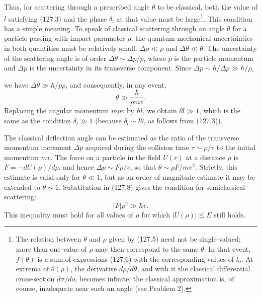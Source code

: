Thus, for scattering through a prescribed angle $\theta$ to be classical, both the value of $l$ satisfying (127.3) and the phase $\delta_l$ at that value must be large\footnote{The relation between $\theta$ and $\rho$ given by (127.5) need not be single-valued; more than one value of $\rho$ may then correspond to the same $\theta$. In that event, $f(\theta)$ is a sum of expressions (127.6) with the corresponding values of $l_0$. At extrema of $\theta(\rho)$, the derivative $d\rho/d\theta$, and with it the classical differential cross-section $d\sigma/do$, becomes infinite; the classical approximation is, of course, inadequate near such an angle (see Problem 2).}. This condition has a simple meaning. To speak of classical scattering through an angle $\theta$ for a particle passing with impact parameter $\rho$, the quantum-mechanical uncertainties in both quantities must be relatively small: $\Delta\rho\ll\rho$ and $\Delta\theta\ll\theta$. The uncertainty of the scattering angle is of order $\Delta\theta\sim\Delta p/p$, where $p$ is the particle momentum and $\Delta p$ is the uncertainty in its transverse component. Since $\Delta p\sim\hbar/\Delta\rho\gg\hbar/\rho$,

we have $\Delta\theta\gg\hbar/p\rho$, and consequently, in any event,
\begin{equation}
 \theta\gg\frac{\hbar}{\rho mv}.
 \tag{127.8}
\end{equation}
Replacing the angular momentum $m\rho v$ by $\hbar l$, we obtain $\theta l\gg1$, which is the same as the condition $\delta_l\gg1$ (because $\delta_l\sim l\theta$, as follows from (127.3)).

The classical deflection angle can be estimated as the ratio of the transverse momentum increment $\Delta p$ acquired during the collision time $\tau\sim\rho/v$ to the initial momentum $mv$. The force on a particle in the field $U(r)$ at a distance $\rho$ is $F=-dU(\rho)/d\rho$, and hence $\Delta p\sim F\rho/v$, so that $\theta\sim\rho F/mv^2$. Strictly, this estimate is valid only for $\theta\ll1$, but as an order-of-magnitude estimate it may be extended to $\theta\sim1$. Substitution in (127.8) gives the condition for semiclassical scattering:
\begin{equation}
 |F|\rho^2\gg\hbar v.
 \tag{127.9}
\end{equation}
This inequality must hold for all values of $\rho$ for which $|U(\rho)|\lesssim E$ still holds.



